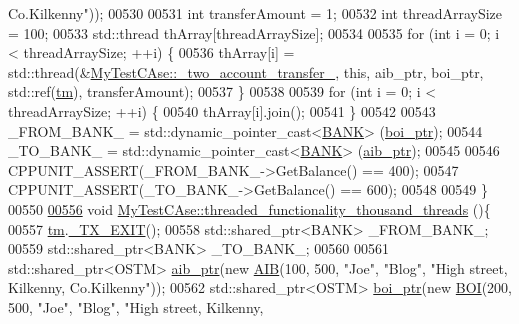 \begin{DoxyCode}
{       Co.Kilkenny"}));
00530     
00531     \textcolor{keywordtype}{int} transferAmount = 1;
00532     \textcolor{keywordtype}{int} threadArraySize = 100; 
00533     std::thread thArray[threadArraySize];
00534 
00535     \textcolor{keywordflow}{for} (\textcolor{keywordtype}{int} i = 0; i < threadArraySize; ++i) \{
00536         thArray[i] = std::thread(&\hyperlink{class_my_test_c_ase_af0cc86421d281cc4a583a394ae86dbdd_af0cc86421d281cc4a583a394ae86dbdd}{MyTestCAse::\_two\_account\_transfer\_}, \textcolor{keyword}{
      this}, aib\_ptr, boi\_ptr, std::ref(\hyperlink{class_my_test_c_ase_a422e6e5d4ddedea384be96031c89b72b_a422e6e5d4ddedea384be96031c89b72b}{tm}), transferAmount);
00537     \}
00538     
00539     \textcolor{keywordflow}{for} (\textcolor{keywordtype}{int} i = 0; i < threadArraySize; ++i) \{
00540         thArray[i].join();
00541     \}
00542     
00543     \_FROM\_BANK\_ = std::dynamic\_pointer\_cast<\hyperlink{class_b_a_n_k}{BANK}> (\hyperlink{class_my_test_c_ase_a5554de9e3e6393a89c66c036c529720b_a5554de9e3e6393a89c66c036c529720b}{boi\_ptr});
00544     \_TO\_BANK\_ = std::dynamic\_pointer\_cast<\hyperlink{class_b_a_n_k}{BANK}> (\hyperlink{class_my_test_c_ase_adad50e8278b64aa0321000b528e5362c_adad50e8278b64aa0321000b528e5362c}{aib\_ptr});
00545     
00546     CPPUNIT\_ASSERT(\_FROM\_BANK\_->GetBalance() == 400);
00547     CPPUNIT\_ASSERT(\_TO\_BANK\_->GetBalance() == 600);
00548     
00549 \}
00550 
\hypertarget{_my_test_c_ase_8cpp_source.tex_l00556}{}\hyperlink{class_my_test_c_ase_a03f867cf5e2295e4055fe88d825b1710_a03f867cf5e2295e4055fe88d825b1710}{00556} \textcolor{keywordtype}{void} \hyperlink{class_my_test_c_ase_a03f867cf5e2295e4055fe88d825b1710_a03f867cf5e2295e4055fe88d825b1710}{MyTestCAse::threaded\_functionality\_thousand\_threads}
      ()\{
00557     \hyperlink{class_my_test_c_ase_a422e6e5d4ddedea384be96031c89b72b_a422e6e5d4ddedea384be96031c89b72b}{tm}.\hyperlink{class_t_m_a5e2d1127f2429f2f524d25f430eade06_a5e2d1127f2429f2f524d25f430eade06}{\_TX\_EXIT}();
00558     std::shared\_ptr<BANK> \_FROM\_BANK\_;
00559     std::shared\_ptr<BANK> \_TO\_BANK\_;
00560     
00561     std::shared\_ptr<OSTM> \hyperlink{class_my_test_c_ase_adad50e8278b64aa0321000b528e5362c_adad50e8278b64aa0321000b528e5362c}{aib\_ptr}(\textcolor{keyword}{new} \hyperlink{class_a_i_b}{AIB}(100, 500, \textcolor{stringliteral}{"Joe"}, \textcolor{stringliteral}{"Blog"}, \textcolor{stringliteral}{"High street, Kilkenny,
       Co.Kilkenny"}));
00562     std::shared\_ptr<OSTM> \hyperlink{class_my_test_c_ase_a5554de9e3e6393a89c66c036c529720b_a5554de9e3e6393a89c66c036c529720b}{boi\_ptr}(\textcolor{keyword}{new} \hyperlink{class_b_o_i}{BOI}(200, 500, \textcolor{stringliteral}{"Joe"}, \textcolor{stringliteral}{"Blog"}, \textcolor{stringliteral}{"High street, Kilkenny,
}
\end{DoxyCode}
